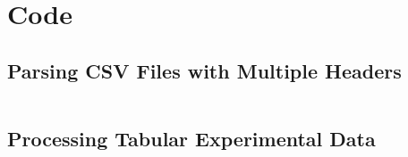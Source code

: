\documentclass[a4paper, oneside]{memoir}
\begin{document}

\appendix







\chapter{Code}

\section{Parsing CSV Files with Multiple Headers}
\label{a:eval:collection:future:header:py}
\inputminted[fontsize=\normalsize,firstline=7,lastline=35]{python}{../src/csvheader.py}

\section{Processing Tabular Experimental Data}
\label{a:eval:collection:tabular:py}
\inputminted[fontsize=\normalsize]{python}{../src/tabulardata.py}

\printbibliography

\printindex
\end{document}
